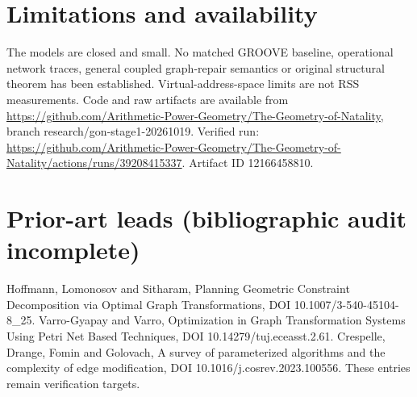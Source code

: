 \documentclass[10pt,a4paper]{article}
\begin{document}
\section{Limitations and availability}
The models are closed and small. No matched GROOVE baseline, operational network traces, general coupled graph-repair semantics or original structural theorem has been established. Virtual-address-space limits are not RSS measurements. Code and raw artifacts are available from \url{https://github.com/Arithmetic-Power-Geometry/The-Geometry-of-Natality}, branch research/gon-stage1-20261019. Verified run: \url{https://github.com/Arithmetic-Power-Geometry/The-Geometry-of-Natality/actions/runs/39208415337}. Artifact ID 12166458810.
\section*{Prior-art leads (bibliographic audit incomplete)}
Hoffmann, Lomonosov and Sitharam, Planning Geometric Constraint Decomposition via Optimal Graph Transformations, DOI 10.1007/3-540-45104-8\_25. Varro-Gyapay and Varro, Optimization in Graph Transformation Systems Using Petri Net Based Techniques, DOI 10.14279/tuj.eceasst.2.61. Crespelle, Drange, Fomin and Golovach, A survey of parameterized algorithms and the complexity of edge modification, DOI 10.1016/j.cosrev.2023.100556. These entries remain verification targets.
\end{document}
